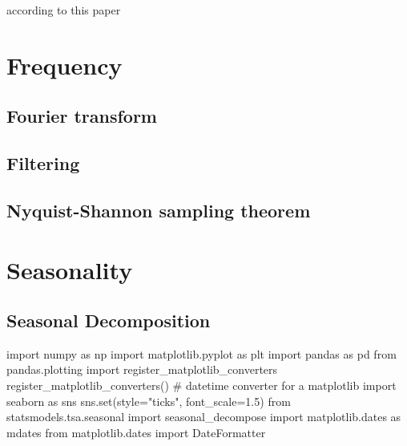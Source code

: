 \documentclass[
  letterpaper,
  DIV=11,
  numbers=noendperiod,
  oneside]{scrreprt}
\newenvironment{Shaded}{\begin{snugshade}}{\end{snugshade}}
\newcommand{\BuiltInTok}[1]{\textcolor[rgb]{0.00,0.23,0.31}{#1}}
\newcommand{\CommentTok}[1]{\textcolor[rgb]{0.37,0.37,0.37}{#1}}
\newcommand{\FloatTok}[1]{\textcolor[rgb]{0.68,0.00,0.00}{#1}}
\newcommand{\ImportTok}[1]{\textcolor[rgb]{0.00,0.46,0.62}{#1}}
\newcommand{\NormalTok}[1]{\textcolor[rgb]{0.00,0.23,0.31}{#1}}
\newcommand{\OperatorTok}[1]{\textcolor[rgb]{0.37,0.37,0.37}{#1}}
\newcommand{\StringTok}[1]{\textcolor[rgb]{0.13,0.47,0.30}{#1}}
\begin{document}
according to this paper

\part{Frequency}

\hypertarget{fourier-transform}{%
\chapter{Fourier transform}\label{fourier-transform}}

\hypertarget{filtering}{%
\chapter{Filtering}\label{filtering}}

\hypertarget{nyquist-shannon-sampling-theorem}{%
\chapter{Nyquist-Shannon sampling
theorem}\label{nyquist-shannon-sampling-theorem}}

\part{Seasonality}

\hypertarget{seasonal-decomposition}{%
\chapter{Seasonal Decomposition}\label{seasonal-decomposition}}

\begin{Shaded}
\begin{Highlighting}[]
\ImportTok{import}\NormalTok{ numpy }\ImportTok{as}\NormalTok{ np}
\ImportTok{import}\NormalTok{ matplotlib.pyplot }\ImportTok{as}\NormalTok{ plt}
\ImportTok{import}\NormalTok{ pandas }\ImportTok{as}\NormalTok{ pd}
\ImportTok{from}\NormalTok{ pandas.plotting }\ImportTok{import}\NormalTok{ register\_matplotlib\_converters}
\NormalTok{register\_matplotlib\_converters()  }\CommentTok{\# datetime converter for a matplotlib}
\ImportTok{import}\NormalTok{ seaborn }\ImportTok{as}\NormalTok{ sns}
\NormalTok{sns.}\BuiltInTok{set}\NormalTok{(style}\OperatorTok{=}\StringTok{"ticks"}\NormalTok{, font\_scale}\OperatorTok{=}\FloatTok{1.5}\NormalTok{)}
\ImportTok{from}\NormalTok{ statsmodels.tsa.seasonal }\ImportTok{import}\NormalTok{ seasonal\_decompose}
\ImportTok{import}\NormalTok{ matplotlib.dates }\ImportTok{as}\NormalTok{ mdates}
\ImportTok{from}\NormalTok{ matplotlib.dates }\ImportTok{import}\NormalTok{ DateFormatter}
\end{Highlighting}
\end{Shaded}
\end{document}
